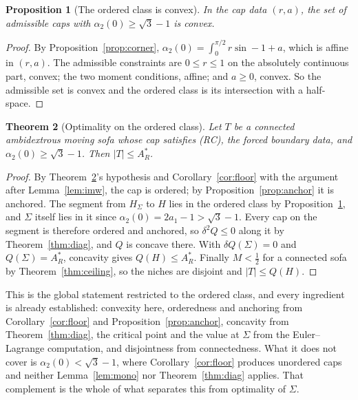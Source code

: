 \documentclass[11pt]{article}
\newtheorem{theorem}{Theorem}
\newtheorem{proposition}[theorem]{Proposition}
\theoremstyle{definition}
\newcommand{\Sig}{\Sigma}
\begin{document}
\begin{proposition}[The ordered class is convex]\label{prop:ordconvex}
In the cap data $(r,a)$, the set of admissible caps with $\alpha_2(0)\ge\sqrt3-1$ is
convex.
\end{proposition}

\begin{proof}
By Proposition~\ref{prop:corner}, $\alpha_2(0)=\int_0^{\pi/2}r\sin-1+a$, which is affine
in $(r,a)$. The admissible constraints are $0\le r\le1$ on the absolutely continuous part,
convex; the two moment conditions, affine; and $a\ge0$, convex. So the admissible set is
convex and the ordered class is its intersection with a half-space.
\end{proof}

\begin{theorem}[Optimality on the ordered class]\label{thm:ordopt}
Let $T$ be a connected ambidextrous moving sofa whose cap satisfies (RC), the forced
boundary data, and $\alpha_2(0)\ge\sqrt3-1$. Then $|T|\le A_R^\ast$.
\end{theorem}

\begin{proof}
By Theorem~\ref{thm:ordopt}'s hypothesis and Corollary~\ref{cor:floor} with the argument
after Lemma~\ref{lem:imw}, the cap is ordered; by Proposition~\ref{prop:anchor} it is
anchored. The segment from $H_\Sig$ to $H$ lies in the ordered class by
Proposition~\ref{prop:ordconvex}, and $\Sig$ itself lies in it since
$\alpha_2(0)=2a_1-1>\sqrt3-1$. Every cap on the segment is therefore ordered and anchored,
so $\delta^2Q\le0$ along it by Theorem~\ref{thm:diag}, and $Q$ is concave there. With
$\delta Q(\Sig)=0$ and $Q(\Sig)=A_R^\ast$, concavity gives $Q(H)\le A_R^\ast$. Finally
$M<\tfrac12$ for a connected sofa by Theorem~\ref{thm:ceiling}, so the niches are disjoint
and $|T|\le Q(H)$.
\end{proof}

This is the global statement restricted to the ordered class, and every ingredient is
already established: convexity here, orderedness and anchoring from
Corollary~\ref{cor:floor} and Proposition~\ref{prop:anchor}, concavity from
Theorem~\ref{thm:diag}, the critical point and the value at $\Sig$ from the
Euler--Lagrange computation, and disjointness from connectedness. What it does not cover is
$\alpha_2(0)<\sqrt3-1$, where Corollary~\ref{cor:floor} produces unordered caps and neither
Lemma~\ref{lem:mono} nor Theorem~\ref{thm:diag} applies. That complement is the whole of
what separates this from optimality of $\Sig$.
\end{document}
